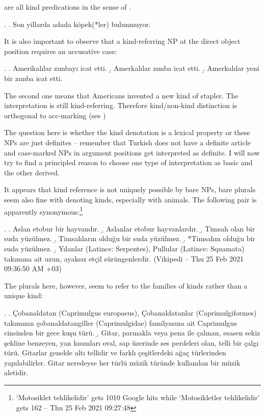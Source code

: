 \documentclass[11pt,a4paper]{article}
\begin{document}
are all kind predications in the sense of .


\ex.
\a. Son yillarda adada köpek(*ler) bulunmuyor.



It is also important to observe that a kind-referring NP at the direct object position requires an accusative case:

\ex.
\a. Amerikalılar zımbayı icat etti.
\b. Amerkalılar zımba icat etti.
\b. Amerkalılar yeni bir zımba icat etti.

The second one means that Americans invented a new kind of stapler. The interpretation is still kind-referring. Therefore kind/non-kind distinction is orthogonal to acc-marking (see )

The question here is whether the kind denotation is a lexical property or these NPs are just definites -- remember that Turkish does not have a definite article and case-marked NPs in argument positions get interpreted as definite. I will now try to find a principled reason to choose one type of interpretation as basic and the other derived.

It appears that kind reference is not uniquely possible by bare NPs, bare plurals seem also fine with denoting kinds, especially with animals. The following pair is apparently synonymous:\footnote{`Motosiklet tehlikelidir' gets 1010 Google hits while `Motosikletler tehlikelidir' gets 162 -- Thu 25 Feb 2021 09:27:48}


\ex.
\a. Aslan etobur bir hayvandır.
\b. Aslanlar etobur hayvanlardır.
\b. Timsah olan bir suda yüzülmez.
\b. Timsahların olduğu bir suda yüzülmez.
\b. *Timsahın olduğu bir suda yüzülmez.
\b. Yılanlar (Latince: Serpentes), Pullular (Latince: Squamata) takımına ait uzun, ayaksız etçil sürüngenlerdir. (Vikipedi -- Thu 25 Feb 2021 09:36:50 AM +03)

The plurals here, however, seem to refer to the families of kinds rather than a unique kind:

\ex.
\a. Çobanaldatan (Caprimulgus europaeus), Çobanaldatanlar (Caprimulgiformes) takımının çobanaldatangiller (Caprimulgidae) familyasına ait Caprimulgus cinsinden bir gece kuşu türü.
\b. Gitar, parmakla veya pena ile çalınan, esasen sekiz şekline benzeyen, yan kısımları oval, sap üzerinde ses perdeleri olan, telli bir çalgı türü. Gitarlar genelde altı tellidir ve farklı çeşitlerdeki ağaç türlerinden yapılabilirler. Gitar neredeyse her türlü müzik türünde kullanılan bir müzik aletidir. 
\end{document}
